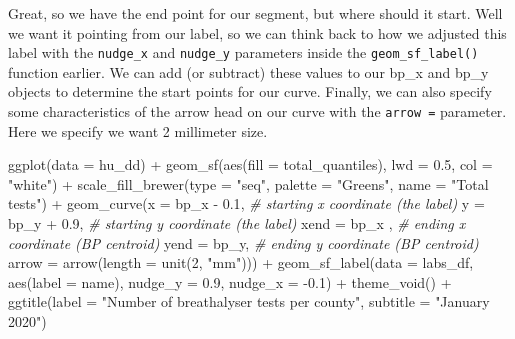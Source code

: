 \documentclass[
]{book}
\newenvironment{Shaded}{\begin{snugshade}}{\end{snugshade}}
\newcommand{\AttributeTok}[1]{\textcolor[rgb]{0.77,0.63,0.00}{#1}}
\newcommand{\CommentTok}[1]{\textcolor[rgb]{0.56,0.35,0.01}{\textit{#1}}}
\newcommand{\DecValTok}[1]{\textcolor[rgb]{0.00,0.00,0.81}{#1}}
\newcommand{\FloatTok}[1]{\textcolor[rgb]{0.00,0.00,0.81}{#1}}
\newcommand{\FunctionTok}[1]{\textcolor[rgb]{0.00,0.00,0.00}{#1}}
\newcommand{\NormalTok}[1]{#1}
\newcommand{\SpecialCharTok}[1]{\textcolor[rgb]{0.00,0.00,0.00}{#1}}
\newcommand{\StringTok}[1]{\textcolor[rgb]{0.31,0.60,0.02}{#1}}
\begin{document}
Great, so we have the end point for our segment, but where should it start. Well we want it pointing from our label, so we can think back to how we adjusted this label with the \texttt{nudge\_x} and \texttt{nudge\_y} parameters inside the \texttt{geom\_sf\_label()} function earlier. We can add (or subtract) these values to our bp\_x and bp\_y objects to determine the start points for our curve. Finally, we can also specify some characteristics of the arrow head on our curve with the \texttt{arrow\ =} parameter. Here we specify we want 2 millimeter size.

\begin{Shaded}
\begin{Highlighting}[]
\FunctionTok{ggplot}\NormalTok{(}\AttributeTok{data =}\NormalTok{ hu\_dd) }\SpecialCharTok{+} 
  \FunctionTok{geom\_sf}\NormalTok{(}\FunctionTok{aes}\NormalTok{(}\AttributeTok{fill =}\NormalTok{ total\_quantiles), }
          \AttributeTok{lwd =} \FloatTok{0.5}\NormalTok{, }\AttributeTok{col =} \StringTok{"white"}\NormalTok{) }\SpecialCharTok{+} 
  \FunctionTok{scale\_fill\_brewer}\NormalTok{(}\AttributeTok{type =} \StringTok{"seq"}\NormalTok{, }
                    \AttributeTok{palette =} \StringTok{"Greens"}\NormalTok{,}
                    \AttributeTok{name =} \StringTok{"Total tests"}\NormalTok{) }\SpecialCharTok{+} 
  \FunctionTok{geom\_curve}\NormalTok{(}\AttributeTok{x =}\NormalTok{ bp\_x }\SpecialCharTok{{-}} \FloatTok{0.1}\NormalTok{,  }\CommentTok{\# starting x coordinate (the label)}
             \AttributeTok{y =}\NormalTok{ bp\_y }\SpecialCharTok{+} \FloatTok{0.9}\NormalTok{, }\CommentTok{\# starting y coordinate (the label)}
             \AttributeTok{xend =}\NormalTok{ bp\_x , }\CommentTok{\# ending x coordinate (BP centroid)}
             \AttributeTok{yend =}\NormalTok{ bp\_y,  }\CommentTok{\# ending y coordinate (BP centroid)}
             \AttributeTok{arrow =} \FunctionTok{arrow}\NormalTok{(}\AttributeTok{length =} \FunctionTok{unit}\NormalTok{(}\DecValTok{2}\NormalTok{, }\StringTok{"mm"}\NormalTok{))) }\SpecialCharTok{+}
  \FunctionTok{geom\_sf\_label}\NormalTok{(}\AttributeTok{data =}\NormalTok{ labs\_df, }
                \FunctionTok{aes}\NormalTok{(}\AttributeTok{label =}\NormalTok{ name), }
                \AttributeTok{nudge\_y =} \FloatTok{0.9}\NormalTok{, }
                \AttributeTok{nudge\_x =} \SpecialCharTok{{-}}\FloatTok{0.1}\NormalTok{) }\SpecialCharTok{+} 
  \FunctionTok{theme\_void}\NormalTok{() }\SpecialCharTok{+} 
  \FunctionTok{ggtitle}\NormalTok{(}\AttributeTok{label =} \StringTok{"Number of breathalyser tests per county"}\NormalTok{, }
          \AttributeTok{subtitle =} \StringTok{"January 2020"}\NormalTok{)}
\end{Highlighting}
\end{Shaded}
\end{document}
